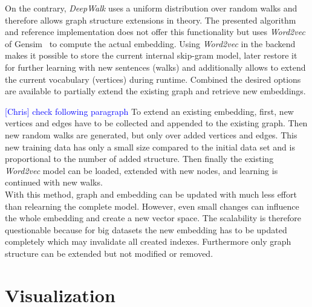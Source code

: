 \documentclass[sigconf]{acmart}
\newcommand{\ce}[1]{\textcolor{blue}{[Chris] #1}}
\newcommand{\ce}[1]{}
\begin{document}
On the contrary, \emph{DeepWalk} uses a uniform distribution over random walks and therefore allows graph structure extensions in theory. The presented algorithm and reference implementation does not offer this functionality but uses \emph{Word2vec} of Gensim~\cite{rehurek_lrec} to compute the actual embedding. Using \emph{Word2vec} in the backend makes it possible to store the current internal skip-gram model, later restore it for further learning with new sentences (walks) and additionally allows to extend the current vocabulary (vertices) during runtime. Combined the desired options are available to partially extend the existing graph and retrieve new embeddings.

\ce{check following paragraph}
To extend an existing embedding, first, new vertices and edges have to be collected and appended to the existing graph. Then new random walks are generated, but only over added vertices and edges. This new training data has only a small size compared to the initial data set and is proportional to the number of added structure. Then finally the existing \emph{Word2vec} model can be loaded, extended with new nodes, and learning is continued with new walks. \\


With this method, graph and embedding can be updated with much less effort than relearning the complete model. However, even small changes can influence the whole embedding and create a new vector space. The scalability is therefore questionable because for big datasets the new embedding has to be updated completely which may invalidate all created indexes. Furthermore only graph structure can be extended but not modified or removed.



\section{Visualization}
\label{sec:viz_approach}
\end{document}

